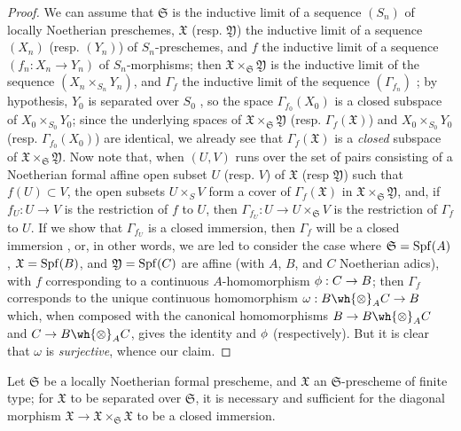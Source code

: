 \begin{proof}
\label{proof-1.10.15.4}
We can assume that $\mathfrak{S}$ is the inductive limit of a sequence $(S_n)$ of locally Noetherian preschemes, $\mathfrak{X}$ (resp. $\mathfrak{Y}$) the inductive limit of a sequence $(X_n)$ (resp. $(Y_n)$) of $S_n$-preschemes, and $f$ the inductive limit of a sequence $(f_n:X_n\to Y_n)$ of $S_n$-morphisms;
then $\mathfrak{X}\times_\mathfrak{S}\mathfrak{Y}$ is the inductive limit of the sequence $(X_n\times_{S_n}Y_n)$, and $\Gamma_f$ the inductive limit of the sequence $(\Gamma_{f_n})$ ;
by hypothesis, $Y_0$ is separated over $S_0$ , so the space $\Gamma_{f_0}(X_0)$ is a closed subspace of $X_0\times_{S_0}Y_0$;
since the underlying spaces of $\mathfrak{X}\times_\mathfrak{S}\mathfrak{Y}$ (resp. $\Gamma_f(\mathfrak{X})$) and $X_0\times_{S_0}Y_0$ (resp. $\Gamma_{f_0}(X_0)$) are identical, we already see that $\Gamma_f(\mathfrak{X})$ is a \emph{closed} subspace of $\mathfrak{X}\times_\mathfrak{S}\mathfrak{Y}$.
Now note that, when $(U,V)$ runs over the set of pairs consisting of a Noetherian formal affine open subset $U$ (resp. $V$) of $\mathfrak{X}$ (resp $\mathfrak{Y}$) such that $f(U)\subset V$, the open subsets $U\times_S V$ form a cover of $\Gamma_f(\mathfrak{X})$ in $\mathfrak{X}\times_\mathfrak{S}\mathfrak{Y}$, and, if $f_U:U\to V$ is the restriction of $f$ to $U$, then $\Gamma_{f_U}:U\to U\times_\mathfrak{S}V$ is the restriction of $\Gamma_f$ to $U$.
If we show that $\Gamma_{f_U}$ is a closed immersion, then $\Gamma_f$ will be a closed immersion , or, in other words, we are led to consider the case where $\mathfrak{S}=\operatorname{Spf}(A)$, $\mathfrak{X}=\operatorname{Spf}(B)$, and $\mathfrak{Y}=\operatorname{Spf}(C)$ are affine (with $A$, $B$, and $C$ Noetherian adics), with $f$ corresponding to a continuous $A$-homomorphism $\vphi:C\to B$;
then $\Gamma_f$ corresponds to the unique continuous homomorphism $\omega: B\wh{\otimes}_A C\to B$ which, when composed with the canonical homomorphisms $B\to B\wh{\otimes}_A C$ and $C\to B\wh{\otimes}_A C$, gives the identity and $\phi$ (respectively).
But it is clear that $\omega$ is \emph{surjective}, whence our claim.
\end{proof}

\begin{corollary}[10.15.5]
\label{1.10.15.5}
Let $\mathfrak{S}$ be a locally Noetherian formal prescheme, and $\mathfrak{X}$ an $\mathfrak{S}$-prescheme of finite type;
for $\mathfrak{X}$ to be separated over $\mathfrak{S}$, it is necessary and sufficient for the diagonal morphism $\mathfrak{X}\to\mathfrak{X}\times_\mathfrak{S}\mathfrak{X}$ to be a closed immersion.
\end{corollary}

